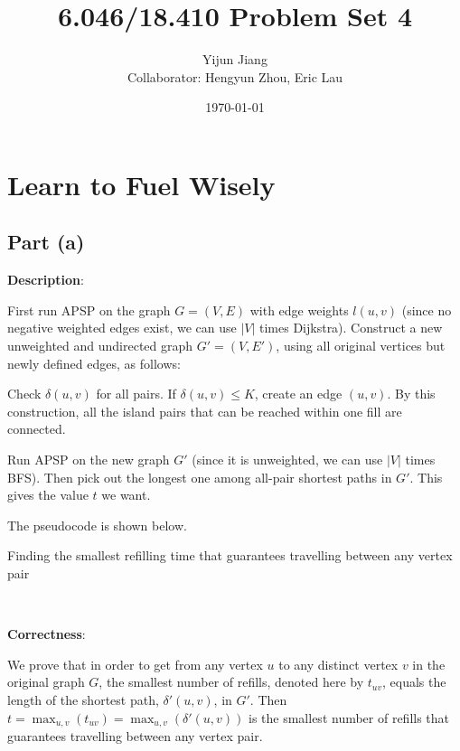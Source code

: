 \documentclass{article}
\title{6.046/18.410 Problem Set 4}
\author{Yijun Jiang\vspace{3pt}\\Collaborator: Hengyun Zhou, Eric Lau}
\date{\today}
\begin{document}
\maketitle
\section{Learn to Fuel Wisely}
\subsection{Part (a)}
\noindent\textbf{Description}:

First run APSP on the graph $G=(V,E)$ with edge weights $l(u,v)$ (since no negative weighted edges exist, we can use $|V|$ times Dijkstra). Construct a new unweighted and undirected graph $G'=(V,E')$, using all original vertices but newly defined edges, as follows:

Check $\delta(u,v)$ for all pairs. If $\delta(u,v)\leqslant K$, create an edge $(u,v)$. By this construction, all the island pairs that can be reached within one fill are connected.

Run APSP on the new graph $G'$ (since it is unweighted, we can use $|V|$ times BFS). Then pick out the longest one among all-pair shortest paths in $G'$. This gives the value $t$ we want.

The pseudocode is shown below.
\begin{algorithm}
\caption{Finding the smallest refilling time that guarantees travelling between any vertex pair}
\begin{algorithmic}[1]
		\EndIf
	\EndFor
\EndFor
{}
\EndProcedure
\end{algorithmic}
\end{algorithm}

~

\noindent\textbf{Correctness}:

We prove that in order to get from any vertex $u$ to any distinct vertex $v$ in the original graph $G$, the smallest number of refills, denoted here by $t_{uv}$, equals the length of the shortest path, $\delta'(u,v)$, in $G'$. Then $t=\displaystyle{\max_{u,v}}(t_{uv})=\displaystyle{\max_{u,v}}(\delta'(u,v))$ is the smallest number of refills that guarantees travelling between any vertex pair.
\end{document}
